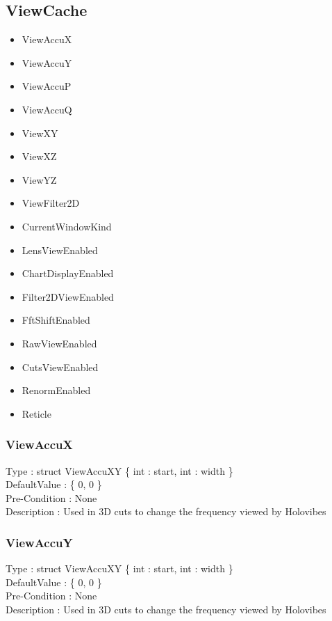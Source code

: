 
\subsection{ViewCache}
\begin{itemize}
    \item ViewAccuX
    \item ViewAccuY
    \item ViewAccuP
    \item ViewAccuQ
    \item ViewXY
    \item ViewXZ
    \item ViewYZ
    \item ViewFilter2D
    \item CurrentWindowKind
    \item LensViewEnabled
    \item ChartDisplayEnabled
    \item Filter2DViewEnabled
    \item FftShiftEnabled
    \item RawViewEnabled
    \item CutsViewEnabled
    \item RenormEnabled
    \item Reticle
\end{itemize}

\subsubsection{ViewAccuX}
\noindent
Type : struct ViewAccuXY \{ int : start, int : width \}\\
DefaultValue : \{ 0, 0 \}\\
Pre-Condition : None\\
Description : Used in 3D cuts to change the frequency viewed by Holovibes\\

\subsubsection{ViewAccuY}
\noindent
Type : struct ViewAccuXY \{ int : start, int : width \}\\
DefaultValue : \{ 0, 0 \}\\
Pre-Condition : None\\
Description : Used in 3D cuts to change the frequency viewed by Holovibes\\

